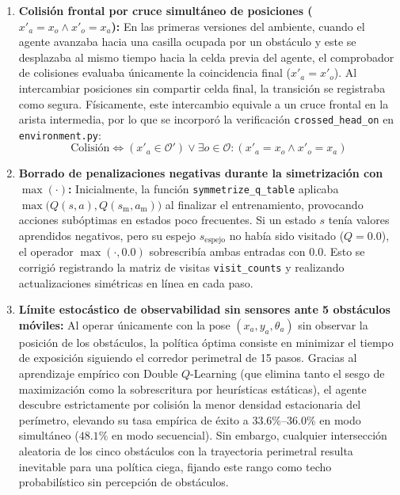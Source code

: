 \documentclass[11pt,a4paper]{article}
\begin{document}
\begin{enumerate}[leftmargin=1.2cm]
    \item \textbf{Colisión frontal por cruce simultáneo de posiciones (\(x'_a = x_o \land x'_o = x_a\)):}
    En las primeras versiones del ambiente, cuando el agente avanzaba hacia una casilla ocupada por un obstáculo y este se desplazaba al mismo tiempo hacia la celda previa del agente, el comprobador de colisiones evaluaba únicamente la coincidencia final (\(x'_a = x'_o\)). Al intercambiar posiciones sin compartir celda final, la transición se registraba como segura. Físicamente, este intercambio equivale a un cruce frontal en la arista intermedia, por lo que se incorporó la verificación \texttt{crossed\_head\_on} en \texttt{environment.py}:
    \begin{equation}
    \text{Colisión} \iff (x'_a \in \mathcal{O}') \lor \exists o \in \mathcal{O}: (x'_a = x_o \land x'_o = x_a)
    \end{equation}

    \item \textbf{Borrado de penalizaciones negativas durante la simetrización con \(\max(\cdot)\):}
    Inicialmente, la función \texttt{symmetrize\_q\_table} aplicaba \(\max\big(Q(s,a), Q(s_{\text{m}}, a_{\text{m}})\big)\) al finalizar el entrenamiento, provocando acciones subóptimas en estados poco frecuentes. Si un estado \(s\) tenía valores aprendidos negativos, pero su espejo \(s_{\text{espejo}}\) no había sido visitado (\(Q = 0.0\)), el operador \(\max(\cdot, 0.0)\) sobrescribía ambas entradas con \(0.0\). Esto se corrigió registrando la matriz de visitas \texttt{visit\_counts} y realizando actualizaciones simétricas en línea en cada paso.

    \item \textbf{Límite estocástico de observabilidad sin sensores ante 5 obstáculos móviles:}
    Al operar únicamente con la pose \((x_a, y_a, \theta_a)\) sin observar la posición de los obstáculos, la política óptima consiste en minimizar el tiempo de exposición siguiendo el corredor perimetral de 15 pasos. Gracias al aprendizaje empírico con Double \(Q\)-Learning (que elimina tanto el sesgo de maximización como la sobrescritura por heurísticas estáticas), el agente descubre estrictamente por colisión la menor densidad estacionaria del perímetro, elevando su tasa empírica de éxito a \(33.6\%\text{--}36.0\%\) en modo simultáneo (\(48.1\%\) en modo secuencial). Sin embargo, cualquier intersección aleatoria de los cinco obstáculos con la trayectoria perimetral resulta inevitable para una política ciega, fijando este rango como techo probabilístico sin percepción de obstáculos.
\end{enumerate}
\end{document}
